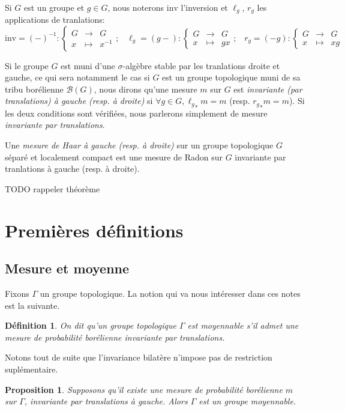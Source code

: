 \documentclass[a4paper,12pt]{article}
\newtheorem{proposition}[theorem]{Proposition}
\newtheorem{definition}[theorem]{Définition}
\newcommand{\Bor}{\mathcal{B}}
\newcommand\fundef[3]{#1: \left\{\begin{array}{ccc}#2\\#3\end{array}\right.}
\newcommand{\inv}{^{-1}}
\newcommand{\blank}{{-}}
\newcommand{\invop}{\mathrm{inv}}
\begin{document}
\paragraph{}
Si $G$ est un groupe et $g\in G$, nous noterons $\invop$ l'inversion et $\ell_g$, $r_g$ les applications de tranlations:
\begin{equation*}
    \fundef{\invop = (\blank)\inv}{G&\to& G}{x&\mapsto& x\inv}\text{;}\quad\fundef{\ell_g=(g\blank)}{G&\to& G}{x&\mapsto& gx}\text{;}\quad\fundef{r_g=(\blank g)}{G&\to& G}{x&\mapsto& xg}
\end{equation*}

Si le groupe $G$ est muni d'une $\sigma$-algèbre stable par les tranlations droite et gauche, ce qui sera notamment le cas
si $G$ est un groupe topologique muni de sa tribu borélienne $\Bor(G)$, nous dirons qu'une mesure $m$ sur $G$ est \textit{invariante
(par translations) à gauche (resp. à droite)} si $\forall g\in G, {\ell_g}_*m = m$ (resp. ${r_g}_*m = m$). Si les deux conditions
sont vérifiées, nous parlerons simplement de mesure \textit{invariante par translations}.

Une \textit{mesure de Haar à gauche (resp. à droite)} sur un groupe topologique $G$ séparé et localement compact est une mesure de
Radon sur $G$ invariante par tranlations à gauche (resp. à droite).

TODO rappeler théorème

\section{Premières définitions}

\subsection{Mesure et moyenne}

Fixons $\Gamma$ un groupe topologique. La notion qui va nous intéresser dans ces notes est la suivante.

\begin{definition}
    On dit qu'un groupe topologique $\Gamma$ est \emph{moyennable} s'il admet une 
    mesure de probabilité borélienne invariante par translations.
\end{definition}

Notons tout de suite que l'invariance bilatère n'impose pas de restriction suplémentaire. 
\begin{proposition}\label{bilateral_of_left}
    Supposons qu'il existe une mesure de probabilité borélienne $m$ sur $\Gamma$, invariante par translations à gauche.
    Alors $\Gamma$ est un groupe moyennable.
\end{proposition} 
\end{document}
